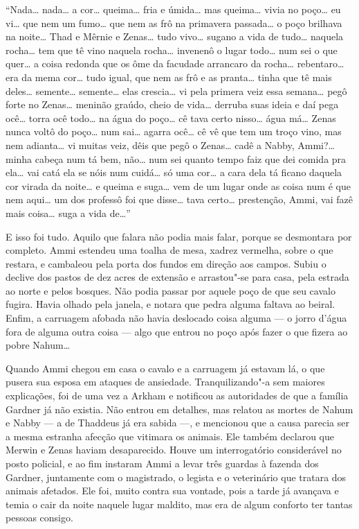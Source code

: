 ``Nada\ldots{} nada\ldots{} a cor\ldots{} queima\ldots{} fria e úmida\ldots{} mas
queima\ldots{} vivia no poço\ldots{} eu vi\ldots{} que nem um fumo\ldots{} que
nem as frô na primavera passada\ldots{} o poço brilhava na noite\ldots{}
Thad e Mêrnie e Zenas\ldots{} tudo vivo\ldots{} sugano a vida de tudo\ldots{}
naquela rocha\ldots{} tem que tê vino naquela rocha\ldots{} invenenô o lugar
todo\ldots{} num sei o que quer\ldots{} a coisa redonda que os ôme da
facudade arrancaro da rocha\ldots{} rebentaro\ldots{} era da mema cor\ldots{}
tudo igual, que nem as frô e as pranta\ldots{} tinha que tê mais deles\ldots{} semente\ldots{} semente\ldots{} elas crescia\ldots{} vi pela primera veiz
essa semana\ldots{} pegô forte no Zenas\ldots{} meninão graúdo, cheio de
vida\ldots{} derruba suas ideia e daí pega ocê\ldots{} torra ocê todo\ldots{}
na água do poço\ldots{} cê tava certo nisso\ldots{} água má\ldots{} Zenas
nunca voltô do poço\ldots{} num sai\ldots{} agarra ocê\ldots{} cê vê que tem
um troço vino, mas nem adianta\ldots{} vi muitas veiz, dêis que pegô o
Zenas\ldots{} cadê a Nabby, Ammi?\ldots{} minha cabeça num tá bem, não\ldots{}
num sei quanto tempo faiz que dei comida pra ela\ldots{} vai catá ela se
nóis num cuidá\ldots{} só uma cor\ldots{} a cara dela tá ficano daquela cor
virada da noite\ldots{} e queima e suga\ldots{} vem de um lugar onde as coisa
num é que nem aqui\ldots{} um dos professô foi que disse\ldots{} tava certo\ldots{} prestenção, Ammi, vai fazê mais coisa\ldots{} suga a vida de\ldots{}''

E isso foi tudo. Aquilo que falara não podia mais falar, porque se
desmontara por completo. Ammi estendeu uma toalha de mesa, xadrez
vermelha, sobre o que restara, e cambaleou pela porta dos fundos em
direção aos campos. Subiu o declive dos pastos de dez acres de extensão
e arrastou"-se para casa, pela estrada ao norte e pelos bosques. Não
podia passar por aquele poço de que seu cavalo fugira. Havia olhado pela
janela, e notara que pedra alguma faltava ao beiral. Enfim, a carruagem
afobada não havia deslocado coisa alguma --- o jorro d'água fora de
alguma outra coisa --- algo que
entrou no poço após fazer o que fizera ao pobre Nahum\ldots{}

Quando Ammi chegou em casa o cavalo e a carruagem já estavam lá, o que
pusera sua esposa em ataques de ansiedade. Tranquilizando"-a sem maiores
explicações, foi de uma vez a Arkham e notificou as autoridades de que a
família Gardner já não existia. Não entrou em detalhes, mas relatou as
mortes de Nahum e Nabby --- a de Thaddeus já era sabida
---, e mencionou que a causa
parecia ser a mesma estranha afecção que vitimara os animais. Ele também
declarou que Merwin e Zenas haviam desaparecido. Houve um interrogatório
considerável no posto policial, e ao fim instaram Ammi a levar três
guardas à fazenda dos Gardner, juntamente com o magistrado, o legista e
o veterinário que tratara dos animais afetados. Ele foi, muito contra
sua vontade, pois a tarde já avançava e temia o cair da noite naquele
lugar maldito, mas era de algum conforto ter tantas pessoas consigo.

